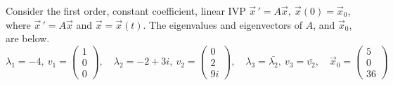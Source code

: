 \ifnum {}
\newpage
\question[4] Consider the first order, constant coefficient, linear IVP $\vec x \, ' = A\vec x, \ \vec x (0) = \vec x_0$, where $\vec x \, ' = A\vec x$ and $\vec x = \vec x(t)$. The eigenvalues and eigenvectors of $A$, and $\vec x_0$, are below. 
$$\lambda_1 = -4, \  v_1 = \begin{pmatrix}1\\0\\0 \end{pmatrix} , \quad \lambda_2 = -2+3i, \  v_2 = \begin{pmatrix} 0\\2\\9i \end{pmatrix}, \quad \lambda_3 = \bar{\lambda_2}, \ v_3 = \bar{v_2}, \quad \vec x_0 = \begin{pmatrix} 5\\0\\36\end{pmatrix}$$
